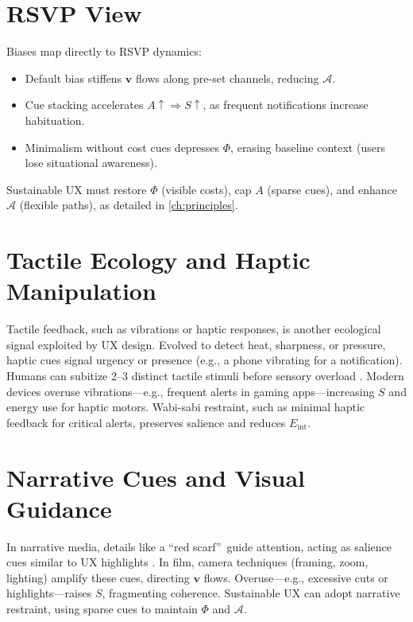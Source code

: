 \documentclass[openany]{book}
\newcommand{\PhiS}{\Phi} %
\newcommand{\vvec}{\mathbf{v}} %
\newcommand{\Sent}{S} %
\newcommand{\Eint}{E_{\mathrm{int}}} %
\newcommand{\Auton}{\mathcal{A}} %
\begin{document}
\section{RSVP View}
\label{sec:illusion-rsvp}
Biases map directly to RSVP dynamics:
\begin{itemize}
  \item Default bias stiffens $\vvec$ flows along pre-set channels, reducing $\Auton$.
  \item Cue stacking accelerates $A \uparrow \Rightarrow \Sent \uparrow$, as frequent notifications increase habituation.
  \item Minimalism without cost cues depresses $\PhiS$, erasing baseline context (users lose situational awareness).
\end{itemize}
Sustainable UX must restore $\PhiS$ (visible costs), cap $A$ (sparse cues), and enhance $\Auton$ (flexible paths), as detailed in \cref{ch:principles}.

\section{Tactile Ecology and Haptic Manipulation}
\label{sec:tactile}
Tactile feedback, such as vibrations or haptic responses, is another ecological signal exploited by UX design. Evolved to detect heat, sharpness, or pressure, haptic cues signal urgency or presence (e.g., a phone vibrating for a notification). Humans can subitize 2--3 distinct tactile stimuli before sensory overload \citep{gallace2006}. Modern devices overuse vibrations---e.g., frequent alerts in gaming apps---increasing $\Sent$ and energy use for haptic motors. Wabi-sabi restraint, such as minimal haptic feedback for critical alerts, preserves salience and reduces $\Eint$.

\section{Narrative Cues and Visual Guidance}
\label{sec:narrative}
In narrative media, details like a \textquotedblleft red scarf\textquotedblright\ guide attention, acting as salience cues similar to UX highlights \citep{lewis1942}. In film, camera techniques (framing, zoom, lighting) amplify these cues, directing $\vvec$ flows. Overuse---e.g., excessive cuts or highlights---raises $\Sent$, fragmenting coherence. Sustainable UX can adopt narrative restraint, using sparse cues to maintain $\PhiS$ and $\Auton$.
\end{document}
